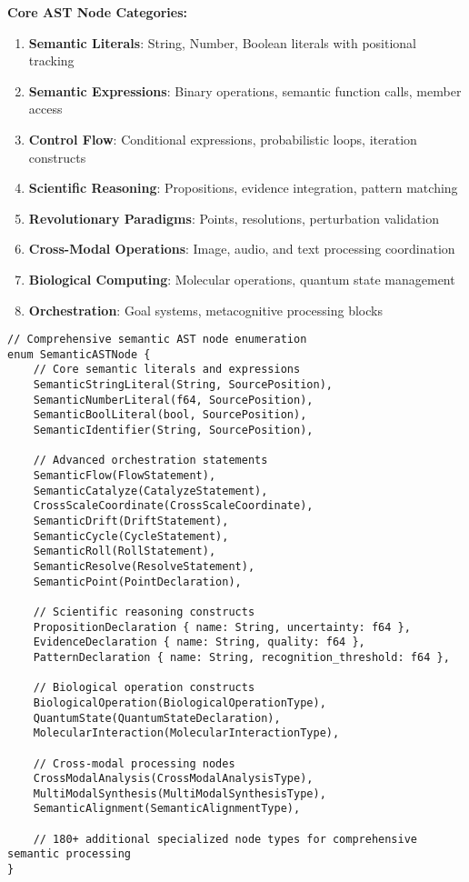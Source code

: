 \documentclass[12pt,a4paper,twoside]{article}
\begin{document}
\textbf{Core AST Node Categories:}

\begin{enumerate}
\item \textbf{Semantic Literals}: String, Number, Boolean literals with positional tracking
\item \textbf{Semantic Expressions}: Binary operations, semantic function calls, member access
\item \textbf{Control Flow}: Conditional expressions, probabilistic loops, iteration constructs
\item \textbf{Scientific Reasoning}: Propositions, evidence integration, pattern matching
\item \textbf{Revolutionary Paradigms}: Points, resolutions, perturbation validation
\item \textbf{Cross-Modal Operations}: Image, audio, and text processing coordination
\item \textbf{Biological Computing}: Molecular operations, quantum state management
\item \textbf{Orchestration}: Goal systems, metacognitive processing blocks
\end{enumerate}

\begin{lstlisting}[caption=Theoretical AST Node Structure]
// Comprehensive semantic AST node enumeration
enum SemanticASTNode {
    // Core semantic literals and expressions
    SemanticStringLiteral(String, SourcePosition),
    SemanticNumberLiteral(f64, SourcePosition),
    SemanticBoolLiteral(bool, SourcePosition),
    SemanticIdentifier(String, SourcePosition),

    // Advanced orchestration statements
    SemanticFlow(FlowStatement),
    SemanticCatalyze(CatalyzeStatement),
    CrossScaleCoordinate(CrossScaleCoordinate),
    SemanticDrift(DriftStatement),
    SemanticCycle(CycleStatement),
    SemanticRoll(RollStatement),
    SemanticResolve(ResolveStatement),
    SemanticPoint(PointDeclaration),

    // Scientific reasoning constructs
    PropositionDeclaration { name: String, uncertainty: f64 },
    EvidenceDeclaration { name: String, quality: f64 },
    PatternDeclaration { name: String, recognition_threshold: f64 },

    // Biological operation constructs
    BiologicalOperation(BiologicalOperationType),
    QuantumState(QuantumStateDeclaration),
    MolecularInteraction(MolecularInteractionType),

    // Cross-modal processing nodes
    CrossModalAnalysis(CrossModalAnalysisType),
    MultiModalSynthesis(MultiModalSynthesisType),
    SemanticAlignment(SemanticAlignmentType),

    // 180+ additional specialized node types for comprehensive semantic processing
}
\end{lstlisting}
\end{document}
